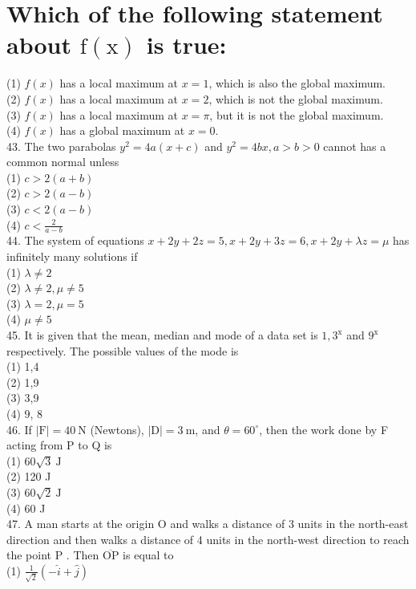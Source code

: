 \documentclass[10pt]{article}
\begin{document}
\section*{Which of the following statement about $\mathrm{f}(\mathrm{x})$ is true:}
(1) $f(x)$ has a local maximum at $x=1$, which is also the global maximum.\\
(2) $f(x)$ has a local maximum at $x=2$, which is not the global maximum.\\
(3) $f(x)$ has a local maximum at $x=\pi$, but it is not the global maximum.\\
(4) $f(x)$ has a global maximum at $x=0$.\\
43. The two parabolas $y^{2}=4 a(x+c)$ and $y^{2}=4 b x, a>b>0$ cannot has a common normal unless\\
(1) $c>2(a+b)$\\
(2) $c>2(a-b)$\\
(3) $c<2(a-b)$\\
(4) $c<\frac{2}{a-b}$\\
44. The system of equations $x+2 y+2 z=5, x+2 y+3 z=6, x+2 y+\lambda z=\mu$ has infinitely many solutions if\\
(1) $\lambda \neq 2$\\
(2) $\lambda \neq 2, \mu \neq 5$\\
(3) $\lambda=2, \mu=5$\\
(4) $\mu \neq 5$\\
45. It is given that the mean, median and mode of a data set is $1,3^{\mathrm{x}}$ and $9^{\mathrm{x}}$ respectively. The possible values of the mode is\\
(1) 1,4\\
(2) 1,9\\
(3) 3,9\\
(4) 9, 8\\
46. If $|\mathrm{F}|=40 \mathrm{~N}$ (Newtons), $|\mathrm{D}|=3 \mathrm{~m}$, and $\theta=60^{\circ}$, then the work done by F acting from P to Q is\\
(1) $60 \sqrt{3} \mathrm{~J}$\\
(2) 120 J\\
(3) $60 \sqrt{2} \mathrm{~J}$\\
(4) 60 J\\
47. A man starts at the origin O and walks a distance of 3 units in the north-east direction and then walks a distance of 4 units in the north-west direction to reach the point P . Then $\overline{\mathrm{OP}}$ is equal to\\
(1) $\frac{1}{\sqrt{2}}(-\hat{i}+\hat{j})$\\
\end{document}
